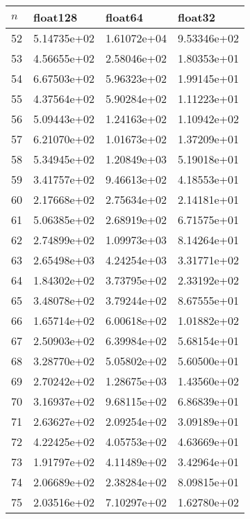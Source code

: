 \documentclass{article}
\begin{document}
\begin{table}[H]
{\begin{tabular}{|l|l|l|l|}
\end{tabular}
\hspace*{0cm}
}
\parbox{.45\linewidth}{
\hspace*{0cm}
\begin{tabular}{|l|l|l|l|}
\hline
$n$ & float128 & float64 & float32 \\ \hline
52 & 5.14735e+02 & 1.61072e+04 & 9.53346e+02 \\ \hline
53 & 4.56655e+02 & 2.58046e+02 & 1.80353e+01 \\ \hline
54 & 6.67503e+02 & 5.96323e+02 & 1.99145e+01 \\ \hline
55 & 4.37564e+02 & 5.90284e+02 & 1.11223e+01 \\ \hline
56 & 5.09443e+02 & 1.24163e+02 & 1.10942e+02 \\ \hline
57 & 6.21070e+02 & 1.01673e+02 & 1.37209e+01 \\ \hline
58 & 5.34945e+02 & 1.20849e+03 & 5.19018e+01 \\ \hline
59 & 3.41757e+02 & 9.46613e+02 & 4.18553e+01 \\ \hline
60 & 2.17668e+02 & 2.75634e+02 & 2.14181e+01 \\ \hline
61 & 5.06385e+02 & 2.68919e+02 & 6.71575e+01 \\ \hline
62 & 2.74899e+02 & 1.09973e+03 & 8.14264e+01 \\ \hline
63 & 2.65498e+03 & 4.24254e+03 & 3.31771e+02 \\ \hline
64 & 1.84302e+02 & 3.73795e+02 & 2.33192e+02 \\ \hline
65 & 3.48078e+02 & 3.79244e+02 & 8.67555e+01 \\ \hline
66 & 1.65714e+02 & 6.00618e+02 & 1.01882e+02 \\ \hline
67 & 2.50903e+02 & 6.39984e+02 & 5.68154e+01 \\ \hline
68 & 3.28770e+02 & 5.05802e+02 & 5.60500e+01 \\ \hline
69 & 2.70242e+02 & 1.28675e+03 & 1.43560e+02 \\ \hline
70 & 3.16937e+02 & 9.68115e+02 & 6.86839e+01 \\ \hline
71 & 2.63627e+02 & 2.09254e+02 & 3.09189e+01 \\ \hline
72 & 4.22425e+02 & 4.05753e+02 & 4.63669e+01 \\ \hline
73 & 1.91797e+02 & 4.11489e+02 & 3.42964e+01 \\ \hline
74 & 2.06689e+02 & 2.38284e+02 & 8.09815e+01 \\ \hline
75 & 2.03516e+02 & 7.10297e+02 & 1.62780e+02 \\ \hline

\end{tabular}}
\end{table}
\end{document}
